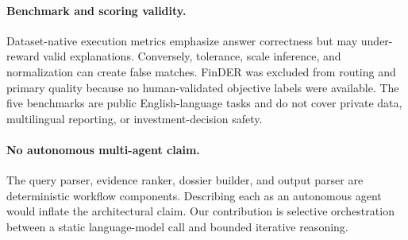 \paragraph{Benchmark and scoring validity.}
Dataset-native execution metrics emphasize answer correctness but may under-reward valid explanations. Conversely, tolerance, scale inference, and normalization can create false matches. FinDER was excluded from routing and primary quality because no human-validated objective labels were available. The five benchmarks are public English-language tasks and do not cover private data, multilingual reporting, or investment-decision safety.

\paragraph{No autonomous multi-agent claim.}
The query parser, evidence ranker, dossier builder, and output parser are deterministic workflow components. Describing each as an autonomous agent would inflate the architectural claim. Our contribution is selective orchestration between a static language-model call and bounded iterative reasoning.
